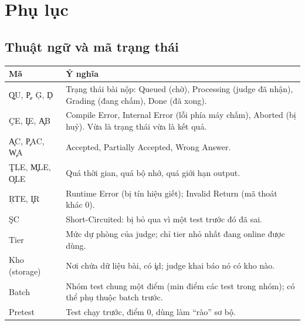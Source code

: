 \appendix
\section{Phụ lục}

\subsection{Thuật ngữ và mã trạng thái}
\begin{center}\small
\begin{tabularx}{\textwidth}{@{}L{2.2cm}Y@{}}
\toprule
Mã & Ý nghĩa \\
\midrule
\c{QU}, \c{P}, \c{G}, \c{D} & Trạng thái bài nộp: Queued (chờ), Processing (judge đã nhận), Grading (đang chấm), Done (đã xong). \\
\c{CE}, \c{IE}, \c{AB} & Compile Error, Internal Error (lỗi phía máy chấm), Aborted (bị huỷ). Vừa là trạng thái vừa là kết quả. \\
\c{AC}, \c{PAC}, \c{WA} & Accepted, Partially Accepted, Wrong Answer. \\
\c{TLE}, \c{MLE}, \c{OLE} & Quá thời gian, quá bộ nhớ, quá giới hạn output. \\
\c{RTE}, \c{IR} & Runtime Error (bị tín hiệu giết); Invalid Return (mã thoát khác 0). \\
\c{SC} & Short-Circuited: bị bỏ qua vì một test trước đó đã sai. \\
Tier & Mức dự phòng của judge; chỉ tier nhỏ nhất đang online được dùng. \\
Kho (storage) & Nơi chứa dữ liệu bài, có \c{id}; judge khai báo nó có kho nào. \\
Batch & Nhóm test chung một điểm (min điểm các test trong nhóm); có thể phụ thuộc batch trước. \\
Pretest & Test chạy trước, điểm 0, dùng làm ``rào'' sơ bộ. \\
\bottomrule
\end{tabularx}
\end{center}


